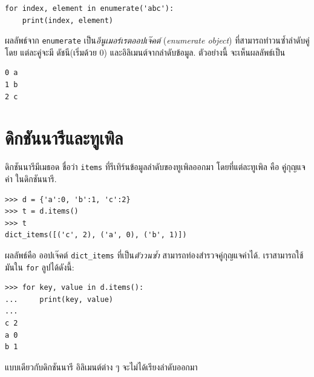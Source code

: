 \begin{verbatim}
for index, element in enumerate('abc'):
    print(index, element)
\end{verbatim}
%
%
ผลลัพธ์จาก \texttt{enumerate} เป็น\textit{อีนูเมอร์เรตออปเจ๊คต์} (\textit{enumerate object}) ที่สามารถทำวนซ้ำลำดับคู่ 
โดย แต่ละคู่จะมี ดัชนี(เริ่มด้วย 0) และอิลิเมนต์จากลำดับข้อมูล.
ตัวอย่างนี้ จะเห็นผลลัพธ์เป็น
%
\begin{verbatim}
0 a
1 b
2 c
\end{verbatim}
%


\section{ดิกชันนารีและทูเพิล}
\label{dictuple}

%
ดิกชันนารีมีเมธอด ชื่อว่า \texttt{items} ที่รีเทิร์นข้อมูลลำดับของทูเพิลออกมา
โดยที่แต่ละทูเพิล คือ คู่กุญแจค่า ในดิกชันนารี.

\begin{verbatim}
>>> d = {'a':0, 'b':1, 'c':2}
>>> t = d.items()
>>> t
dict_items([('c', 2), ('a', 0), ('b', 1)])
\end{verbatim}
%
%
ผลลัพธ์คือ ออปเจ๊คต์ \verb|dict_items|
ที่เป็น\textit{ตัววนซ้ำ} สามารถท่องสำรวจคู่กุญแจค่าได้.
เราสามารถใช้มันใน \texttt{for} ลูปได้ดังนี้:
%

\begin{verbatim}
>>> for key, value in d.items():
...     print(key, value)
...
c 2
a 0
b 1
\end{verbatim}
%
%
แบบเดียวกับดิกชันนารี อิลิเมนต์ต่าง ๆ จะไม่ได้เรียงลำดับออกมา

